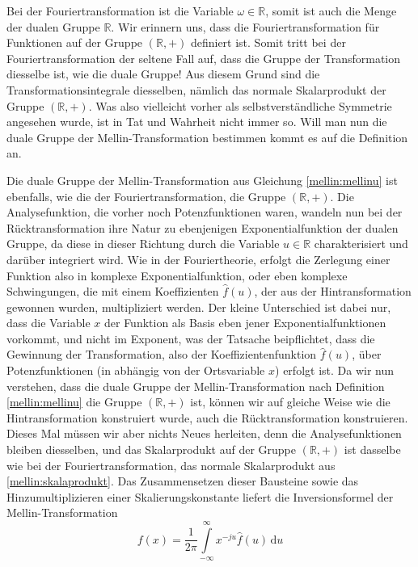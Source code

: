 Bei der Fouriertransformation ist die Variable $\omega \in \mathbb{R}$, somit ist auch die Menge der dualen Gruppe $\mathbb{R}$.
Wir erinnern uns, dass die Fouriertransformation für Funktionen auf der Gruppe $(\mathbb{R},+)$ definiert ist. 
Somit tritt bei der Fouriertransformation der seltene Fall auf, dass die Gruppe der Transformation diesselbe ist, wie die duale Gruppe!
Aus diesem Grund sind die Transformationsintegrale diesselben, nämlich das normale Skalarprodukt der Gruppe $(\mathbb{R},+)$.
Was also vielleicht vorher als selbstverständliche Symmetrie angesehen wurde, ist in Tat und Wahrheit nicht immer so.
Will man nun die duale Gruppe der Mellin-Transformation bestimmen kommt es auf die Definition an. 

Die duale Gruppe der Mellin-Transformation aus Gleichung \eqref{mellin:mellinu} ist ebenfalls, wie die der Fouriertransformation, die Gruppe 
$(\mathbb{R},+)$.
Die Analysefunktion, die vorher noch Potenzfunktionen waren, wandeln nun bei der Rücktransformation ihre Natur zu ebenjenigen Exponentialfunktion
der dualen Gruppe, da diese in dieser Richtung durch die Variable $u \in \mathbb{R}$ charakterisiert und darüber integriert wird.
Wie in der Fouriertheorie, erfolgt die Zerlegung einer Funktion also in komplexe Exponentialfunktion, oder eben komplexe Schwingungen, die mit einem 
Koeffizienten $\hat{f}(u)$, der aus der Hintransformation gewonnen wurden, multipliziert werden.
Der kleine Unterschied ist dabei nur, dass die Variable $x$ der Funktion als Basis eben jener Exponentialfunktionen vorkommt, und nicht 
im Exponent, was der Tatsache beipflichtet, dass die Gewinnung der Transformation, also der Koeffizientenfunktion $\hat{f}(u)$, über Potenzfunktionen 
(in abhängig von der Ortsvariable $x$) erfolgt ist.
Da wir nun verstehen, dass die duale Gruppe der Mellin-Transformation nach Definition \eqref{mellin:mellinu} die Gruppe $(\mathbb{R},+)$ ist, 
können wir auf gleiche Weise wie die Hintransformation konstruiert wurde, auch die Rücktransformation konstruieren.
Dieses Mal müssen wir aber nichts Neues herleiten, denn die Analysefunktionen bleiben diesselben, und das Skalarprodukt auf der 
Gruppe $(\mathbb{R},+)$ ist dasselbe wie bei der Fouriertransformation, das normale Skalarprodukt aus \eqref{mellin:skalaprodukt}. 
Das Zusammensetzen dieser Bausteine sowie das Hinzumultiplizieren einer Skalierungskonstante liefert die Inversionsformel der 
Mellin-Transformation
\begin{equation}
    f(x) = \frac{1}{2\pi} \int\limits_{-\infty}^{\infty} x^{-ju} \hat{f}(u) \,\mathrm{d}u
    \label{mellin:mellininvu}
\end{equation}

